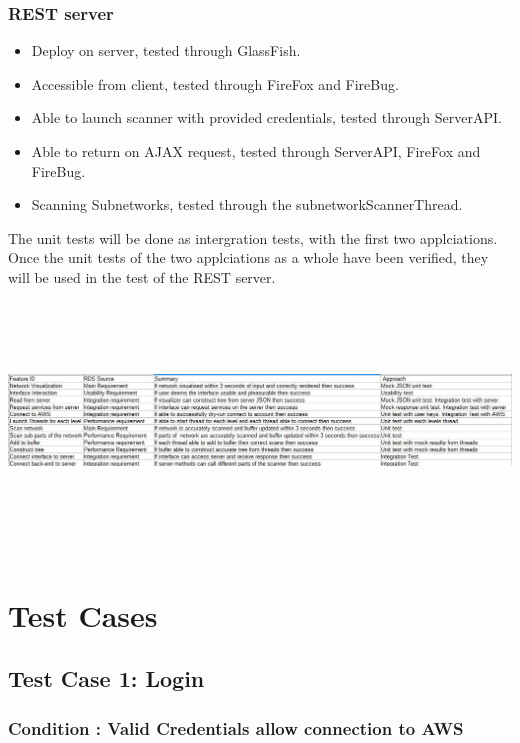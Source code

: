 \documentclass[hidelinks,a4paper,12pt]{article}
\begin{document}
\subsubsection{REST server}
\begin{itemize}
  \item Deploy on server, tested through GlassFish.
  \item Accessible from client, tested through FireFox and FireBug.
  \item Able to launch scanner with provided credentials, tested through ServerAPI.
  \item Able to return on AJAX request, tested through ServerAPI, FireFox and FireBug.
   \item Scanning Subnetworks, tested through the subnetworkScannerThread.
\end{itemize}
The unit tests will be done as intergration tests, with the first two applciations. Once the unit tests of the two applciations as a whole have been verified, they will be used in the test of the REST server.
\newline
\newline
\includegraphics[width=17cm,height=7cm] {./images/table.jpg}

\newpage
 \section{Test Cases}
\subsection{Test Case 1: Login}
\subsubsection{Condition : Valid Credentials allow connection to AWS}
\end{document}
